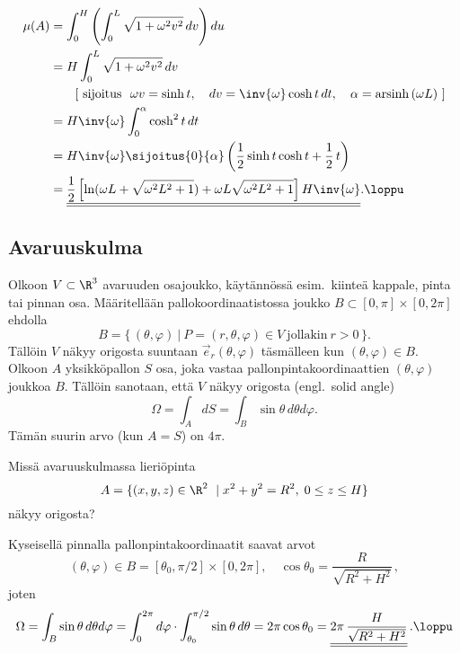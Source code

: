 \begin{align*}
\mu(A) &= \int_0^H\left(\int_0^L \sqrt{1+\omega^2 v^2}\,dv\right)du \\
&= H\int_0^L \sqrt{1+\omega^2 v^2}\,dv \\
&\qquad [\ \text{sijoitus}\ \ \omega v=\sinh t,\quad dv=\inv{\omega}\cosh t\,dt,\quad 
                              \alpha=\text{arsinh}\, (\omega L)\ ] \\
&=H\inv{\omega}\int_0^\alpha \cosh^2 t\,dt \\
&=H\inv{\omega}\sijoitus{0}{\alpha} \left(\frac{1}{2}\sinh t\cosh t+\frac{1}{2}\,t\right) \\
&=\underline{\underline{
    \frac{1}{2}\left[\ln (\omega L +\sqrt{\omega^2 L^2+1})
                                   +\omega L\sqrt{\omega^2 L^2+1}\right]H\inv{\omega}}}. \loppu
\end{align*}

\subsection*{Avaruuskulma}

Olkoon $V\subset\R^3$ avaruuden osajoukko, käytännössä esim.\ kiinteä kappale, pinta tai pinnan
osa. Määritellään pallokoordinaatistossa joukko $B\subset[0,\pi]\times[0,2\pi]$ ehdolla
\[
B=\{\,(\theta,\varphi)\ | \ P=(r,\theta,\varphi) \in V\ \text{jollakin}\ r>0\,\}.
\]
Tällöin $V$ näkyy origosta suuntaan $\vec e_r(\theta,\varphi)$ täsmälleen kun
$(\theta,\varphi) \in B$. Olkoon $A$ yksikköpallon $S$ osa, joka vastaa
pallonpintakoordinaattien $(\theta,\varphi)$ joukkoa $B$. Tällöin sanotaan, että $V$ näkyy
origosta  (engl.\ solid angle)
\[
\Omega=\int_A dS=\int_B \sin\theta\,d\theta d\varphi.
\]
Tämän suurin arvo (kun $A=S$) on $4\pi$.
\begin{Exa}
Missä avaruuskulmassa lieriöpinta
\[
A=\{(x,y,z)\in\R^2 \; | \; x^2+y^2=R^2, \; 0\leq z\leq H\}
\]
näkyy origosta?
\end{Exa}
\ratk Kyseisellä pinnalla pallonpintakoordinaatit saavat arvot
\[
(\theta,\varphi) \in B=[\theta_0,\pi/2]\times[0,2\pi],\quad 
                 \cos\theta_0=\frac{R}{\sqrt{R^2+H^2}}\,,
\]
joten
\[
\Omega = \int_B \sin\theta\,d\theta d\varphi
       = \int_0^{2\pi} d\varphi\cdot\int_{\theta_0}^{\pi/2} \sin\theta\,d\theta
       = 2\pi\cos\theta_0
       =\underline{\underline{2\pi\,\frac{H}{\sqrt{R^2+H^2}}}}\,. \loppu
\]

